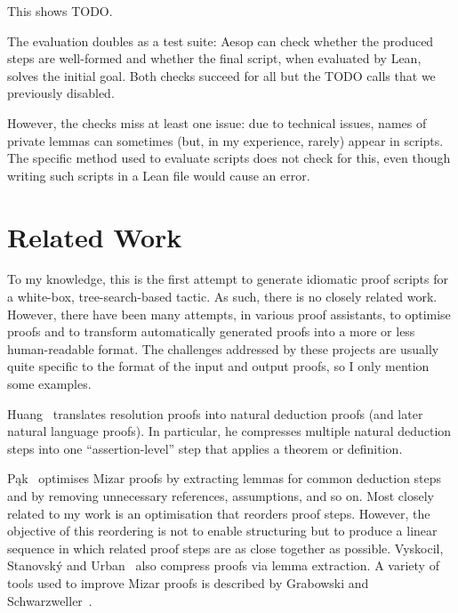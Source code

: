 \documentclass[sigplan,10pt,anonymous,review]{acmart}
\begin{document}
This shows TODO.

\medskip

The evaluation doubles as a test suite: Aesop can check whether the produced steps are well-formed and whether the final script, when evaluated by Lean, solves the initial goal.
Both checks succeed for all but the TODO calls that we previously disabled.

However, the checks miss at least one issue: due to technical issues, names of private lemmas can sometimes (but, in my experience, rarely) appear in scripts.
The specific method used to evaluate scripts does not check for this, even though writing such scripts in a Lean file would cause an error.

\section{Related Work}%
\label{sec:related}

To my knowledge, this is the first attempt to generate idiomatic proof scripts for a white-box, tree-search-based tactic.
As such, there is no closely related work.
However, there have been many attempts, in various proof assistants, to optimise proofs and to transform automatically generated proofs into a more or less human-readable format.
The challenges addressed by these projects are usually quite specific to the format of the input and output proofs, so I only mention some examples.

Huang~\cite{Huang1989,Huang1994,Huang1996} translates resolution proofs into natural deduction proofs (and later natural language proofs).
In particular, he compresses multiple natural deduction steps into one \enquote{assertion-level} step that applies a theorem or definition.

Pąk~\cite{Pak2015,Pak2014a,Pak2014b,Pak2013,Pak2010} optimises Mizar proofs by extracting lemmas for common deduction steps and by removing unnecessary references, assumptions, and so on.
Most closely related to my work is an optimisation that reorders proof steps.
However, the objective of this reordering is not to enable structuring but to produce a linear sequence in which related proof steps are as close together as possible.
Vyskocil, Stanovský and Urban~\cite{Vyskovil2010} also compress proofs via lemma extraction.
A variety of tools used to improve Mizar proofs is described by Grabowski and Schwarzweller~\cite{Grabowski2009}.
\end{document}
